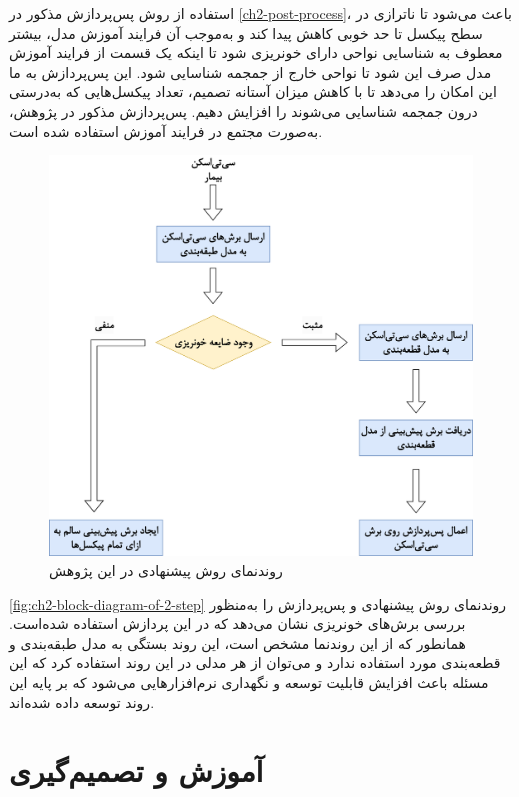 استفاده از روش پس‌پردازش مذکور در 
\autoref{ch2-post-process}،
	باعث می‌شود تا ناترازی در سطح پیکسل تا حد خوبی کاهش پیدا کند و به‌موجب آن فرایند آموزش مدل، بیشتر معطوف به شناسایی نواحی دارای خونریزی شود تا اینکه یک قسمت از فرایند آموزش مدل صرف این شود تا نواحی خارج از جمجمه شناسایی شود. این پس‌پردازش به ما این امکان را می‌دهد تا با کاهش میزان آستانه تصمیم، تعداد پیکسل‌هایی که به‌درستی درون جمجمه شناسایی می‌شوند را افزایش دهیم. پس‌پردازش مذکور در پژوهش، به‌صورت مجتمع در فرایند آموزش استفاده شده است.
	\begin{figure}[h]
\centering
\includegraphics[height=0.5\textheight]{"Images/Chapter2/block diagram of 2 step .drawio"}
\caption{روندنمای روش پیشنهادی در این پژوهش}
\label{fig:ch2-block-diagram-of-2-step}
\end{figure}

\autoref{fig:ch2-block-diagram-of-2-step}
روندنمای روش پیشنهادی و پس‌پردازش را به‌منظور بررسی برش‌های خونریزی نشان می‌دهد که در این پردازش استفاده شده‌است. همانطور که از این روند‌نما مشخص است، این روند بستگی به مدل طبقه‌بندی و قطعه‌بندی مورد استفاده ندارد و می‌توان از هر مدلی در این روند استفاده کرد که این مسئله باعث افزایش قابلیت توسعه و نگهداری نرم‌افزارهایی می‌شود که بر پایه این روند توسعه داده‌ شده‌اند.

\section{آموزش و تصمیم‌گیری}

